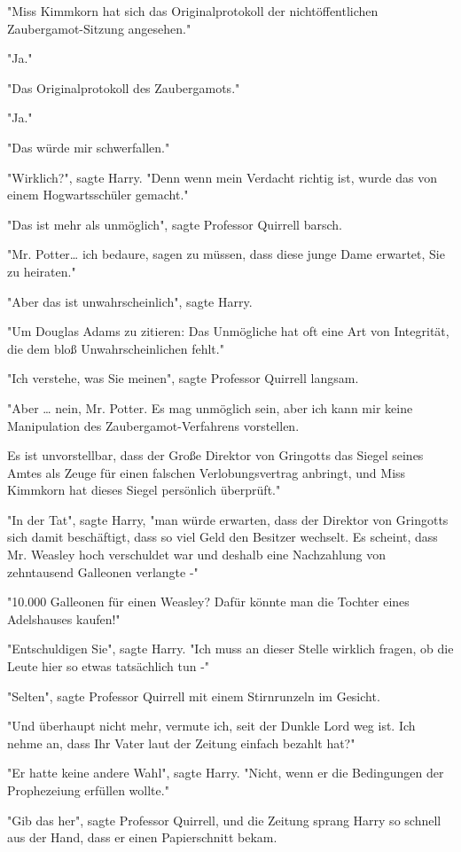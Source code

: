 {"Miss Kimmkorn hat sich das Originalprotokoll der nichtöffentlichen Zaubergamot-Sitzung angesehen."

"Ja."

"Das Originalprotokoll des Zaubergamots."

"Ja."

"Das würde mir schwerfallen."

"Wirklich?", sagte Harry. "Denn wenn mein Verdacht richtig ist, wurde das von einem Hogwartsschüler gemacht."

"Das ist mehr als unmöglich", sagte Professor Quirrell barsch.

"Mr. Potter… ich bedaure, sagen zu müssen, dass diese junge Dame erwartet, Sie zu heiraten."

"Aber das ist unwahrscheinlich", sagte Harry.

"Um Douglas Adams zu zitieren: Das Unmögliche hat oft eine Art von Integrität, die dem bloß Unwahrscheinlichen fehlt."

"Ich verstehe, was Sie meinen", sagte Professor Quirrell langsam.

"Aber … nein, Mr. Potter. Es mag unmöglich sein, aber ich kann mir keine Manipulation des Zaubergamot-Verfahrens vorstellen.

Es ist unvorstellbar, dass der Große Direktor von Gringotts das Siegel seines Amtes als Zeuge für einen falschen Verlobungsvertrag anbringt, und Miss Kimmkorn hat dieses Siegel persönlich überprüft."

"In der Tat", sagte Harry, "man würde erwarten, dass der Direktor von Gringotts sich damit beschäftigt, dass so viel Geld den Besitzer wechselt. Es scheint, dass Mr. Weasley hoch verschuldet war und deshalb eine Nachzahlung von zehntausend Galleonen verlangte -"

"10.000 Galleonen für einen Weasley? Dafür könnte man die Tochter eines Adelshauses kaufen!"

"Entschuldigen Sie", sagte Harry. "Ich muss an dieser Stelle wirklich fragen, ob die Leute hier so etwas tatsächlich tun -"

"Selten", sagte Professor Quirrell mit einem Stirnrunzeln im Gesicht.

"Und überhaupt nicht mehr, vermute ich, seit der Dunkle Lord weg ist. Ich nehme an, dass Ihr Vater laut der Zeitung einfach bezahlt hat?"

"Er hatte keine andere Wahl", sagte Harry. "Nicht, wenn er die Bedingungen der Prophezeiung erfüllen wollte."

"Gib das her", sagte Professor Quirrell, und die Zeitung sprang Harry so schnell aus der Hand, dass er einen Papierschnitt bekam.

}
